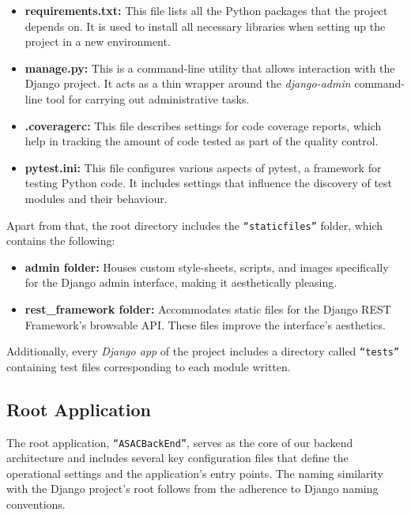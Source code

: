 \begin{itemize}
    \item \textbf{requirements.txt:} This file lists all the Python packages that the project depends on. It is used to install all necessary libraries when setting up the project in a new environment.
    \item \textbf{manage.py:} This is a command-line utility that allows interaction with the Django project. It acts as a thin wrapper around the \textit{django-admin} command-line tool for carrying out administrative tasks.
    \item \textbf{.coveragerc:} This file describes settings for code coverage reports, which help in tracking the amount of code tested as part of the quality control. 
    \item \textbf{pytest.ini:} This file configures various aspects of pytest, a framework for testing Python code. It includes settings that influence the discovery of test modules and their behaviour.
\end{itemize}

Apart from that, the root directory includes the \texttt{``staticfiles''} folder, which contains the following:

\begin{itemize}
    \item \textbf{admin folder:} Houses custom style-sheets, scripts, and images specifically for the Django admin interface, making it aesthetically pleasing.
    \item \textbf{rest\_framework folder:} Accommodates static files for the Django REST Framework's browsable API. These files improve the interface's aesthetics.
\end{itemize}

Additionally, every \textit{Django app} of the project includes a directory called \texttt{``tests''} containing test files corresponding to each module written.

\subsection{Root Application}

The root application, \texttt{``ASACBackEnd''}, serves as the core of our backend architecture and includes several key configuration files that define the operational settings and the application's entry points. The naming similarity with the Django project's root follows from the adherence to Django naming conventions.

